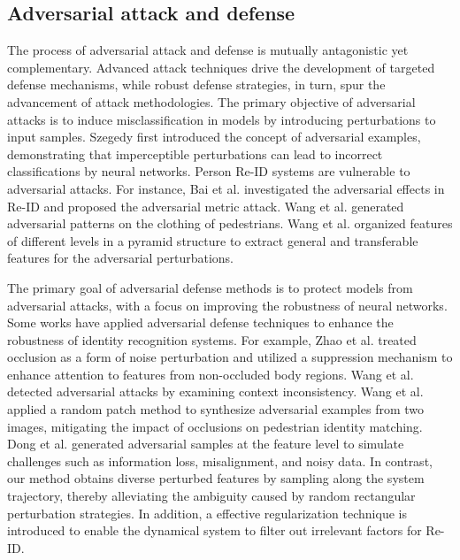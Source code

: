 \documentclass[12pt]{spieman}  %
\begin{document}
\begin{spacing}{2}
\subsection{Adversarial attack and defense}
The process of adversarial attack and defense is mutually antagonistic yet complementary. Advanced attack techniques drive the development of targeted defense mechanisms, while robust defense strategies, in turn, spur the advancement of attack methodologies. The primary objective of adversarial attacks is to induce misclassification in models by introducing perturbations to input samples. Szegedy \cite{szegedy2013intriguing} first introduced the concept of adversarial examples, demonstrating that imperceptible perturbations can lead to incorrect classifications by neural networks. Person Re-ID systems are vulnerable to adversarial attacks. For instance, Bai et al. \cite{bai2020adversarial} investigated the adversarial effects in Re-ID and proposed the adversarial metric attack. Wang et al. \cite{wang2019advpattern} generated adversarial patterns on the clothing of pedestrians. Wang et al. \cite{wang2020transferable} organized features of different levels in a pyramid structure to extract general and transferable features for the adversarial perturbations.

The primary goal of adversarial defense methods is to protect models from adversarial attacks, with a focus on improving the robustness of neural networks. Some works have applied adversarial defense techniques to enhance the robustness of identity recognition systems. For example, Zhao et al. \cite{zhao2021incremental} treated occlusion as a form of noise perturbation and utilized a suppression mechanism to enhance attention to features from non-occluded body regions. Wang et al. \cite{wang2021multi} detected adversarial attacks by examining context inconsistency. Wang et al. \cite{wang2022occluded} applied a random patch method to synthesize adversarial examples from two images, mitigating the impact of occlusions on pedestrian identity matching. Dong et al. \cite{dong2023erasing} generated adversarial samples at the feature level to simulate challenges such as information loss, misalignment, and noisy data. In contrast, our method obtains diverse perturbed features by sampling along the system trajectory, thereby alleviating the ambiguity caused by random rectangular perturbation strategies. In addition, a effective regularization technique is introduced to enable the dynamical system to filter out irrelevant factors for Re-ID.


\end{spacing}
\end{document}

